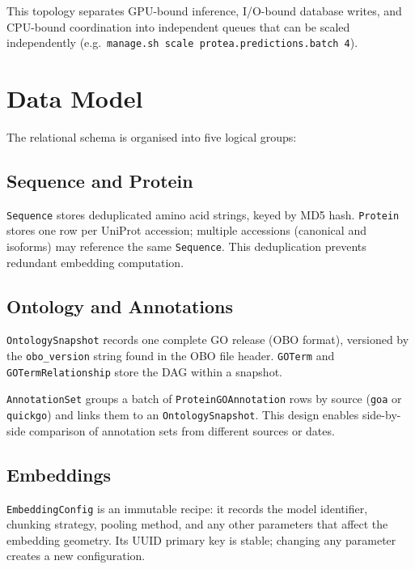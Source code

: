 This topology separates GPU-bound inference, I/O-bound database writes, and
CPU-bound coordination into independent queues that can be scaled independently
(e.g.\ \texttt{manage.sh scale protea.predictions.batch 4}).

\section{Data Model}
\label{sec:data-model}

The relational schema is organised into five logical groups:

\subsection{Sequence and Protein}
\label{subsec:dm-sequence}

\texttt{Sequence} stores deduplicated amino acid strings, keyed by MD5 hash.
\texttt{Protein} stores one row per UniProt accession; multiple accessions
(canonical and isoforms) may reference the same \texttt{Sequence}. This
deduplication prevents redundant embedding computation.

\subsection{Ontology and Annotations}
\label{subsec:dm-ontology}

\texttt{OntologySnapshot} records one complete GO release (OBO format), versioned
by the \texttt{obo\_version} string found in the OBO file header. \texttt{GOTerm}
and \texttt{GOTermRelationship} store the DAG within a snapshot.

\texttt{AnnotationSet} groups a batch of \texttt{ProteinGOAnnotation} rows by
source (\texttt{goa} or \texttt{quickgo}) and links them to an
\texttt{OntologySnapshot}. This design enables side-by-side comparison of
annotation sets from different sources or dates.

\subsection{Embeddings}
\label{subsec:dm-embeddings}

\texttt{EmbeddingConfig} is an immutable recipe: it records the model identifier,
chunking strategy, pooling method, and any other parameters that affect the
embedding geometry. Its UUID primary key is stable; changing any parameter
creates a new configuration.

